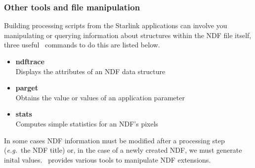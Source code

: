 \documentclass[twoside,11pt]{article}
\newcommand{\htmlref}[2]{#1}
\newcommand{\xref}[3]{#1}
\begin{document}
\begin{\htmlonly}
{\subsubsection{Other tools and file manipulation}

Building processing scripts from the Starlink applications can involve
you manipulating or querying information about structures within the
NDF file itself, three useful \KAPPAref\ commands to do this are listed
below.

\begin{itemize}
\item{\xref{{\bf ndftrace}}{sun95}{NDFTRACE}}\\
Displays the attributes of an NDF data structure 
\item{\xref{{\bf parget}}{sun95}{PARGET}}\\
Obtains the value or values of an application parameter 
\item{\xref{{\bf stats}}{sun95}{STATS}}\\
Computes simple statistics for an NDF's pixels  
\end{itemize}  

In some cases NDF information must be modified after a processing step
(\emph{e.g.}\ the NDF title) or, in the case of a \htmlref{newly
created}{sc16_newndf} NDF,
we must generate inital values.  \KAPPA\ provides various tools to
manipulate NDF extensions.

}
\end{\htmlonly}
\end{document}
